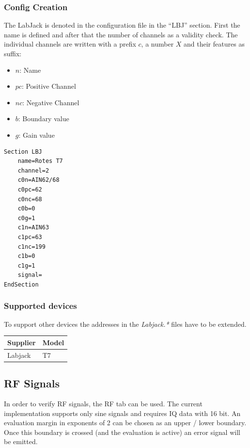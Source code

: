 \documentclass[10pt,a4paper]{article}
\begin{document}
	\subsubsection{Config Creation}	
	The LabJack is denoted in the configuration file in the \enquote{LBJ} section. First the name is defined and after that the number of channels as a validity check. The individual channels are written with a prefix $c$, a number $X$ and their features as suffix:
	
	\begin{itemize}
	\item $n$: Name
	\item $pc$: Positive Channel
	\item $nc$: Negative Channel
	\item $b$: Boundary value
	\item $g$: Gain value
	\end{itemize}
	
\begin{lstlisting}[caption=LBJ Config]
Section LBJ
	name=Rotes T7
	channel=2
	c0n=AIN62/68
	c0pc=62
	c0nc=68
	c0b=0
	c0g=1
	c1n=AIN63
	c1pc=63
	c1nc=199
	c1b=0
	c1g=1
	signal=
EndSection
\end{lstlisting}
	
		\subsubsection{Supported devices}
		To support other devices the addresses in the \textit{Labjack.*} files have to be extended.
	
		\begin{table}[H]
		\centering
		\begin{tabular}{ll}
		\toprule
		Supplier			& Model \\ \midrule
		Labjack				& T7 \\
		\bottomrule
		\end{tabular}			
		\end{table}	

	\newpage
	\subsection{RF Signals}
	In order to verify RF signals, the RF tab can be used. The current implementation supports only sine signals and requires IQ data with 16 bit. An evaluation margin in exponents of 2 can be chosen as an upper / lower boundary. Once this boundary is crossed (and the evaluation is active) an error signal will be emitted.
		
\end{document}
